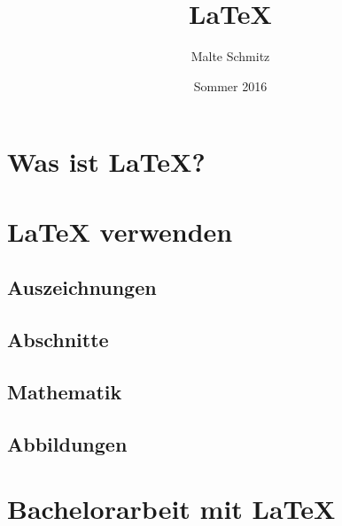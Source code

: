 \documentclass[xcolor=table]{beamer}
\author{Malte Schmitz}
\title{LaTeX}
\institute{Institut für Softwaretechnik und Programmiersprachen}
\date{Sommer 2016}
\begin{document}


\section{Was ist \LaTeX?}

\section{\LaTeX{} verwenden}
\subsection{Auszeichnungen}

\subsection{Abschnitte}
\subsection{Mathematik}
\subsection{Abbildungen}
\section{Bachelorarbeit mit \LaTeX}

\end{document}
